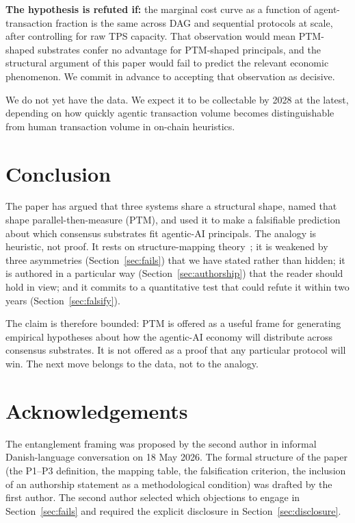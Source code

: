 \documentclass[11pt,a4paper]{article}
\begin{document}
\textbf{The hypothesis is refuted if:} the marginal cost curve as a
function of agent-transaction fraction is the same across DAG and
sequential protocols at scale, after controlling for raw TPS capacity.
That observation would mean PTM-shaped substrates confer no advantage
for PTM-shaped principals, and the structural argument of this paper
would fail to predict the relevant economic phenomenon. We commit in
advance to accepting that observation as decisive.

We do not yet have the data. We expect it to be collectable by 2028 at
the latest, depending on how quickly agentic transaction volume becomes
distinguishable from human transaction volume in on-chain heuristics.

\section{Conclusion}

The paper has argued that three systems share a structural shape, named
that shape parallel-then-measure (PTM), and used it to make a falsifiable
prediction about which consensus substrates fit agentic-AI principals.
The analogy is heuristic, not proof. It rests on structure-mapping
theory~\cite{gentner1983}; it is weakened by three asymmetries
(Section~\ref{sec:fails}) that we have stated rather than hidden; it is
authored in a particular way (Section~\ref{sec:authorship}) that the
reader should hold in view; and it commits to a quantitative test that
could refute it within two years (Section~\ref{sec:falsify}).

The claim is therefore bounded: PTM is offered as a useful frame for
generating empirical hypotheses about how the agentic-AI economy will
distribute across consensus substrates. It is not offered as a proof
that any particular protocol will win. The next move belongs to the
data, not to the analogy.

\section*{Acknowledgements}

The entanglement framing was proposed by the second author in informal
Danish-language conversation on 18 May 2026. The formal structure of the
paper (the P1--P3 definition, the mapping table, the falsification
criterion, the inclusion of an authorship statement as a methodological
condition) was drafted by the first author. The second author selected
which objections to engage in Section~\ref{sec:fails} and required the
explicit disclosure in Section~\ref{sec:disclosure}.
\end{document}

